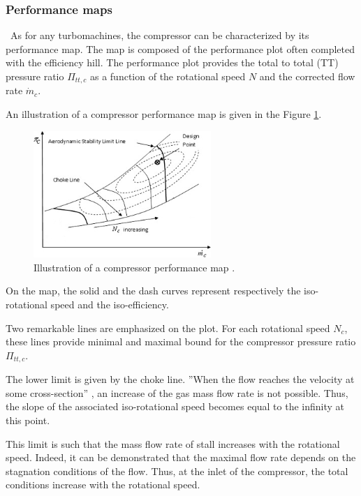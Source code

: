 \subsubsection{Performance maps}
\quad\ As for any turbomachines, the compressor can be characterized by its performance map. The map is composed of the performance plot often completed with the efficiency hill. The performance plot provides the total to total (TT) pressure ratio \(\Pi_{tt,c}\) as a function of the rotational speed \(N\) and the corrected flow rate \(\dot{m}_c\).

An illustration of a compressor performance map is given in the Figure \ref{fig:C4_compmap}.
\begin{figure}[h]
    \centering
    \includegraphics[width=0.6\textwidth]{Comp_Map.png}
    \caption{Illustration of a compressor performance map \cite{Ghorbanian2009}.}
    \label{fig:C4_compmap}
\end{figure}

On the map, the solid and the dash curves represent respectively the iso-rotational speed and the iso-efficiency.

Two remarkable lines are emphasized on the plot. For each rotational speed \(N_c\), these lines provide minimal and maximal bound for the compressor pressure ratio \(\Pi_{tt,c}\).

The lower limit is given by the choke line. ''When the flow reaches the velocity at some cross-section'' \cite{Ghorbanian2009}, an increase of the gas mass flow rate is not possible. Thus, the slope of the associated iso-rotational speed becomes equal to the infinity at this point. 

This limit is such that the mass flow rate of stall increases with the rotational speed. Indeed, it can be demonstrated that the maximal flow rate depends on the stagnation conditions of the flow. Thus, at the inlet of the compressor, the total conditions increase with the rotational speed. 

